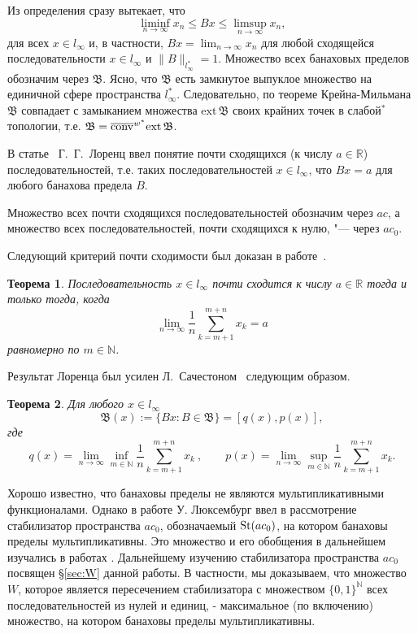 \documentclass[12pt]{article}
\newtheorem{thm}{Теорема}
\def\N{{\mathbb{N}}}
\def\B{{\mathfrak{B}}}
\def\ext{{\mathrm{ext}\,}}
\begin{document}
Из определения сразу вытекает, что
$$\liminf_{n\to\infty}x_n \le Bx \le \limsup_{n\to\infty}x_n,$$
для всех $x\in l_\infty$ и, в частности,
 $\displaystyle
Bx=\lim_{n\to\infty}x_n$ для любой сходящейся
последовательности $x\in l_\infty$ и $\|B\|_{l_\infty^*}=1$. Множество всех банаховых пределов обозначим
 через $\mathfrak{B}$. Ясно, что $\mathfrak{B}$ есть замкнутое выпуклое
множество на единичной сфере пространства $l_\infty^*$. Следовательно, по теореме Крейна-Мильмана $\B$ совпадает с замыканием множества $\ext \B$ своих крайних точек в слабой$^*$ топологии, т.е. $\B={\overline{\rm conv}}^{w^*} \ext \B$.

В статье~\cite{L} Г.~Г.~Лоренц ввел понятие почти сходящихся (к числу $a\in \mathbb R$) последовательностей, т.е. таких последовательностей $x\in l_\infty$, что $Bx=a$ для любого банахова предела $B$.

Множество всех почти сходящихся последовательностей обозначим через $ac$,
а множество всех последовательностей, почти сходящихся к нулю, "--- через $ac_0$.

Следующий критерий почти сходимости был доказан в работе~\cite{L}.
\begin{thm}\label{lorentz}
Последовательность $x\in l_\infty$ почти сходится к числу $a\in \mathbb R$ тогда и только тогда, когда
$$
 \lim_{n\to\infty}\frac1n\sum_{k=m+1}^{m+n}x_k=a
$$
равномерно по $m\in{\mathbb N}$.
\end{thm}

Результат Лоренца был усилен Л.~Сачестоном~\cite{S} следующим образом.
\begin{thm}\label{sucheston}
Для любого $x\in l_\infty$
$$\mathfrak B (x):=\{Bx: B\in \mathfrak B\}=[q(x),p(x)],$$
где
$$
 q(x)=\lim_{n\to\infty}\inf_{m\in\mathbb N}
  \frac1n \sum_{k=m+1}^{m+n} x_k \ ,
\qquad
 p(x)=\lim_{n\to\infty}\sup_{m\in\mathbb N}
  \frac1n \sum_{k=m+1}^{m+n} x_k.
$$
\end{thm}

Хорошо известно, что банаховы пределы не являются мультипликативными функционалами. Однако в работе \cite{Luxemburg} У. Люксембург ввел в рассмотрение стабилизатор пространства $ac_0$, обозначаемый ${\rm St}(ac_0)$, на котором банаховы пределы мультипликативны. Это множество и его обобщения в дальнейшем изучались в работах \cite{Alekhno, SSU2, ASSU4}. Дальнейшему изучению стабилизатора пространства $ac_0$ посвящен  \S\ref{sec:W} данной работы. В частности, мы доказываем, что множество $W$, которое является пересечением стабилизатора с множеством $\{0,1\}^\N$ всех последовательностей из нулей и единиц, - максимальное (по включению) множество, на котором банаховы пределы мультипликативны.
\end{document}
